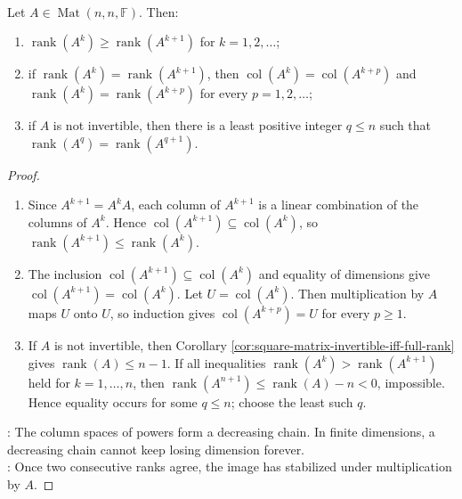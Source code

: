 \begin{theorem} \label{thm:ranks-of-matrix-powers-stabilize} \\
Let $A\in\operatorname{Mat}(n,n,\mathbb{F})$. Then:
\begin{enumerate}[label=(\roman*)]
\setlength{\itemsep}{0pt}
\item $\operatorname{rank}(A^k)\geq\operatorname{rank}(A^{k+1})$ for $k=1,2,\ldots$;
\item if $\operatorname{rank}(A^k)=\operatorname{rank}(A^{k+1})$, then $\operatorname{col}(A^k)=\operatorname{col}(A^{k+p})$ and $\operatorname{rank}(A^k)=\operatorname{rank}(A^{k+p})$ for every $p=1,2,\ldots$;
\item if $A$ is not invertible, then there is a least positive integer $q\leq n$ such that $\operatorname{rank}(A^q)=\operatorname{rank}(A^{q+1})$.
\end{enumerate}
\begin{proof}
\begin{enumerate}[label=(\roman*)]
\setlength{\itemsep}{0pt}
\item Since $A^{k+1}=A^kA$, each column of $A^{k+1}$ is a linear combination of the columns of $A^k$. Hence $\operatorname{col}(A^{k+1})\subseteq\operatorname{col}(A^k)$, so $\operatorname{rank}(A^{k+1})\leq\operatorname{rank}(A^k)$.
\item The inclusion $\operatorname{col}(A^{k+1})\subseteq\operatorname{col}(A^k)$ and equality of dimensions give $\operatorname{col}(A^{k+1})=\operatorname{col}(A^k)$. Let $U=\operatorname{col}(A^k)$. Then multiplication by $A$ maps $U$ onto $U$, so induction gives $\operatorname{col}(A^{k+p})=U$ for every $p\geq1$.
\item If $A$ is not invertible, then Corollary \ref{cor:square-matrix-invertible-iff-full-rank} gives $\operatorname{rank}(A)\leq n-1$. If all inequalities $\operatorname{rank}(A^k)>\operatorname{rank}(A^{k+1})$ held for $k=1,\ldots,n$, then $\operatorname{rank}(A^{n+1})\leq\operatorname{rank}(A)-n<0$, impossible. Hence equality occurs for some $q\leq n$; choose the least such $q$.
\end{enumerate}
: The column spaces of powers form a decreasing chain. In finite dimensions, a decreasing chain cannot keep losing dimension forever.\\
: Once two consecutive ranks agree, the image has stabilized under multiplication by $A$.
\end{proof}
\end{theorem}

